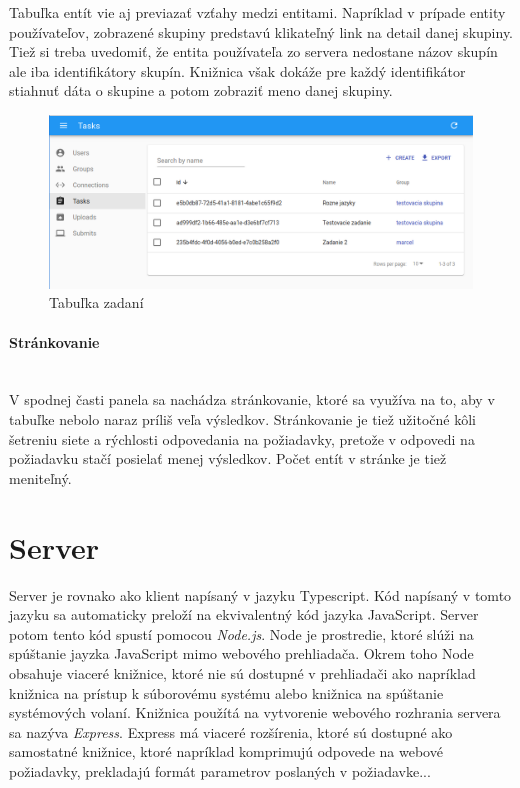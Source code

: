 Tabuľka entít vie aj previazať vzťahy medzi entitami. Napríklad v prípade entity používateľov, 
zobrazené skupiny predstavú klikateľný link na detail danej skupiny. Tiež si treba uvedomiť, že
entita používateľa zo servera nedostane názov skupín ale iba identifikátory skupín. Knižnica 
však dokáže pre každý identifikátor stiahnuť dáta o skupine a potom zobraziť meno danej skupiny.
\begin{figure}[H]
\centerline{\includegraphics[width=1\textwidth]{images/zadania}}
\caption[Tabuľka zadaní]{Tabuľka zadaní}
\label{obr:zadania}
\end{figure}

\paragraph{Stránkovanie}\leavevmode\\
V spodnej časti panela sa nachádza stránkovanie, ktoré sa využíva na to, aby v tabuľke nebolo naraz
príliš veľa výsledkov. Stránkovanie je tiež užitočné kôli šetreniu siete a rýchlosti odpovedania na
požiadavky, pretože v odpovedi na požiadavku stačí posielať menej výsledkov. Počet entít v stránke
je tiež meniteľný.

\section{Server}
Server je rovnako ako klient napísaný v jazyku Typescript. Kód napísaný v tomto jazyku sa
automaticky preloží na ekvivalentný kód jazyka JavaScript. Server potom tento kód spustí pomocou
\textit{Node.js}. Node je prostredie, ktoré slúži na spúštanie jayzka JavaScript mimo webového
prehliadača. Okrem toho Node obsahuje viaceré knižnice, ktoré nie sú dostupné v prehliadači ako
napríklad knižnica na prístup k súborovému systému alebo knižnica na spúštanie systémových volaní.
Knižnica použítá na vytvorenie webového rozhrania servera sa nazýva \textit{Express}. Express má
viaceré rozšírenia, ktoré sú dostupné ako samostatné knižnice, ktoré napríklad komprimujú odpovede
na webové požiadavky, prekladajú formát parametrov poslaných v požiadavke...

